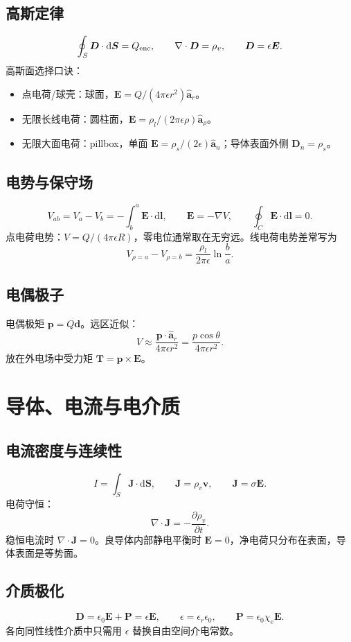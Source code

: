 \documentclass[11pt,a4paper]{ctexart}
\newcommand{\dd}{\mathrm{d}}
\newcommand{\uv}[1]{\hat{\bm a}_{#1}}
\newcommand{\E}{\bm E}
\newcommand{\D}{\bm D}
\newcommand{\J}{\bm J}
\newcommand{\divg}{\nabla\cdot}
\newcommand{\grad}{\nabla}
\begin{document}
\subsection{高斯定律}
\[
\oint_S \D\cdot\dd\bm S=Q_{\rm enc},\qquad \divg\D=\rho_v,\qquad \D=\epsilon\E .
\]
高斯面选择口诀：
\begin{itemize}
\item 点电荷/球壳：球面，$\E=Q/(4\pi\epsilon r^2)\uv r$。
\item 无限长线电荷：圆柱面，$\E=\rho_l/(2\pi\epsilon\rho)\uv\rho$。
\item 无限大面电荷：pillbox，单面 $\E=\rho_s/(2\epsilon)\uv n$；导体表面外侧 $\D_n=\rho_s$。
\end{itemize}

\subsection{电势与保守场}
\[
V_{ab}=V_a-V_b=-\int_b^a \E\cdot\dd\bm l,\qquad
\E=-\grad V,\qquad \oint_C \E\cdot\dd\bm l=0 .
\]
点电荷电势：$V=Q/(4\pi\epsilon R)$，零电位通常取在无穷远。线电荷电势差常写为
\[
V_{\rho=a}-V_{\rho=b}=\frac{\rho_l}{2\pi\epsilon}\ln\frac{b}{a}.
\]

\subsection{电偶极子}
电偶极矩 $\bm p=Q\bm d$。远区近似：
\[
V\approx \frac{\bm p\cdot \uv r}{4\pi\epsilon r^2}
=\frac{p\cos\theta}{4\pi\epsilon r^2}.
\]
放在外电场中受力矩 $\bm T=\bm p\times\E$。

\section{导体、电流与电介质}
\subsection{电流密度与连续性}
\[
I=\int_S \J\cdot\dd\bm S,\qquad
\J=\rho_v\bm v,\qquad
\J=\sigma\E.
\]
电荷守恒：
\[
\divg\J=-\frac{\partial \rho_v}{\partial t}.
\]
稳恒电流时 $\divg\J=0$。良导体内部静电平衡时 $\E=0$，净电荷只分布在表面，导体表面是等势面。

\subsection{介质极化}
\[
\D=\epsilon_0\E+\bm P=\epsilon\E,\qquad
\epsilon=\epsilon_r\epsilon_0,\qquad
\bm P=\epsilon_0\chi_e\E .
\]
各向同性线性介质中只需用 $\epsilon$ 替换自由空间介电常数。
\end{document}
